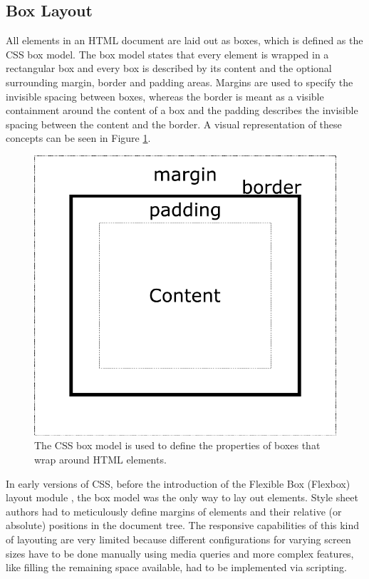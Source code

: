 \subsection{Box Layout}

All elements in an HTML document are laid out as boxes, which is defined as the CSS box model. The box model states that every element is wrapped in a rectangular box and every box is described by its content and the optional surrounding margin, border and padding areas. Margins are used to specify the invisible spacing between boxes, whereas the border is meant as a visible containment around the content of a box and the padding describes the invisible spacing between the content and the border. A visual representation of these concepts can be seen in Figure \ref{fig:BoxModel}.

\begin{figure}[tp]
    \centering
    \includegraphics[keepaspectratio,width=\linewidth,height=\fullh / 3]
    {diagrams/box-model.pdf}

    \caption[CSS Box Model]{
        The CSS box model is used to define the properties of boxes that wrap around HTML elements.
    }
    \label{fig:BoxModel}
\end{figure}

In early versions of CSS, before the introduction of the Flexible Box (Flexbox) layout module \parencite{CSSFlexboxFirstDraft}, the box model was the only way to lay out elements. Style sheet authors had to meticulously define margins of elements and their relative (or absolute) positions in the document tree. The responsive capabilities of this kind of layouting are very limited because different configurations for varying screen sizes have to be done manually using media queries and more complex features, like filling the remaining space available, had to be implemented via scripting.

